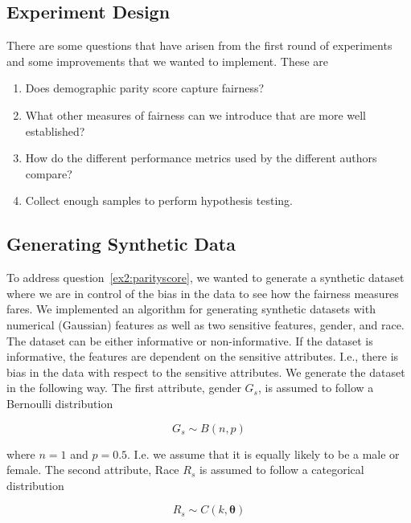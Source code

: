\subsection{Experiment Design}

There are some questions that have arisen from the first round of experiments and some improvements that we wanted to implement. These are

\begin{enumerate}
    \item Does demographic parity score capture fairness? \label{ex2:parityscore}
    \item What other measures of fairness can we introduce that are more well established? \label{ex2:fairnessmeasure}
    \item How do the different performance metrics used by the different authors compare?
    \item Collect enough samples to perform hypothesis testing.
\end{enumerate}

\subsection{Generating Synthetic Data}

To address question~\ref{ex2:parityscore}, we wanted to generate a synthetic dataset where we are in control of the bias in the data to see how the fairness measures fares. We implemented an algorithm for generating synthetic datasets with numerical (Gaussian) features as well as two sensitive features, gender, and race. The dataset can be either informative or non-informative. If the dataset is informative, the features are dependent on the sensitive attributes. I.e., there is bias in the data with respect to the sensitive attributes. We generate the dataset in the following way. The first attribute, gender $G_s$, is assumed to follow a Bernoulli distribution

\begin{equation*}
    G_s \sim B(n, p)
\end{equation*}

where $n = 1$ and $p = 0.5$. I.e. we assume that it is equally likely to be a male or female. The second attribute, Race $R_s$ is assumed to follow a categorical distribution 

\begin{equation*}
    R_s \sim C(k, \boldsymbol{\theta})
\end{equation*}

